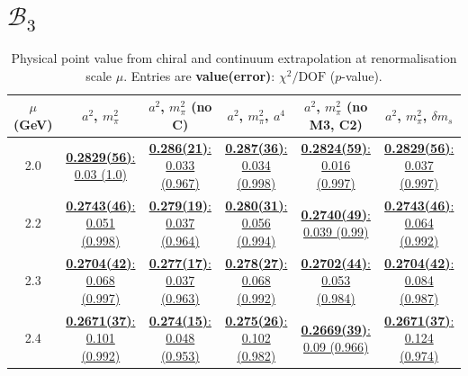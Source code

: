 \documentclass[12pt]{extarticle}
\begin{document}
\section{$\mathcal{B}_3$}
\begin{table}[h!]
\begin{center}
\begin{tabular}{|c|c|c|c|c|c|}
\hline
$\mu$ (GeV) & $a^2$, $m_\pi^2$& $a^2$, $m_\pi^2$ (no C)& $a^2$, $m_\pi^2$, $a^4$& $a^2$, $m_\pi^2$ (no M3, C2)& $a^2$, $m_\pi^2$, $\delta m_s$\\
\hline
2.0& \hyperlink{SSmPP/SUSY/bag_a2m2_20.pdf.1}{\textbf{0.2829(56)}: 0.03 (1.0)} & \hyperlink{SSmPP/SUSY/bag_a2m2noC_20.pdf.1}{\textbf{0.286(21)}: 0.033 (0.967)} & \hyperlink{SSmPP/SUSY/bag_a2a4m2_20.pdf.1}{\textbf{0.287(36)}: 0.034 (0.998)} & \hyperlink{SSmPP/SUSY/bag_a2m2mcut_20.pdf.1}{\textbf{0.2824(59)}: 0.016 (0.997)} & \hyperlink{SSmPP/SUSY/bag_a2m2delm_20.pdf.1}{\textbf{0.2829(56)}: 0.037 (0.997)}\\
2.2& \hyperlink{SSmPP/SUSY/bag_a2m2_22.pdf.1}{\textbf{0.2743(46)}: 0.051 (0.998)} & \hyperlink{SSmPP/SUSY/bag_a2m2noC_22.pdf.1}{\textbf{0.279(19)}: 0.037 (0.964)} & \hyperlink{SSmPP/SUSY/bag_a2a4m2_22.pdf.1}{\textbf{0.280(31)}: 0.056 (0.994)} & \hyperlink{SSmPP/SUSY/bag_a2m2mcut_22.pdf.1}{\textbf{0.2740(49)}: 0.039 (0.99)} & \hyperlink{SSmPP/SUSY/bag_a2m2delm_22.pdf.1}{\textbf{0.2743(46)}: 0.064 (0.992)}\\
2.3& \hyperlink{SSmPP/SUSY/bag_a2m2_23.pdf.1}{\textbf{0.2704(42)}: 0.068 (0.997)} & \hyperlink{SSmPP/SUSY/bag_a2m2noC_23.pdf.1}{\textbf{0.277(17)}: 0.037 (0.963)} & \hyperlink{SSmPP/SUSY/bag_a2a4m2_23.pdf.1}{\textbf{0.278(27)}: 0.068 (0.992)} & \hyperlink{SSmPP/SUSY/bag_a2m2mcut_23.pdf.1}{\textbf{0.2702(44)}: 0.053 (0.984)} & \hyperlink{SSmPP/SUSY/bag_a2m2delm_23.pdf.1}{\textbf{0.2704(42)}: 0.084 (0.987)}\\
2.4& \hyperlink{SSmPP/SUSY/bag_a2m2_24.pdf.1}{\textbf{0.2671(37)}: 0.101 (0.992)} & \hyperlink{SSmPP/SUSY/bag_a2m2noC_24.pdf.1}{\textbf{0.274(15)}: 0.048 (0.953)} & \hyperlink{SSmPP/SUSY/bag_a2a4m2_24.pdf.1}{\textbf{0.275(26)}: 0.102 (0.982)} & \hyperlink{SSmPP/SUSY/bag_a2m2mcut_24.pdf.1}{\textbf{0.2669(39)}: 0.09 (0.966)} & \hyperlink{SSmPP/SUSY/bag_a2m2delm_24.pdf.1}{\textbf{0.2671(37)}: 0.124 (0.974)}\\
\hline
\end{tabular}
\caption{Physical point value from chiral and continuum extrapolation at renormalisation scale $\mu$. Entries are \textbf{value(error)}: $\chi^2/\text{DOF}$ ($p$-value).}
\end{center}
\end{table}
\end{document}
